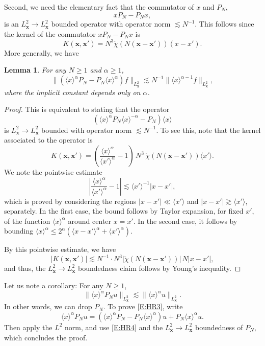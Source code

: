 \documentclass[12pt,letterpaper]{amsart}
\newcommand{\la}{\langle}
\newcommand{\ra}{\rangle}
\newtheorem{lemma}[theorem]{Lemma}
\theoremstyle{remark}
\numberwithin{equation}{section}
\numberwithin{theorem}{section}
\numberwithin{table}{section}
\begin{document}
Second, we need the elementary fact that the commutator of $x$ and $P_N$, 
$$xP_N - P_N x,$$
is an $L_{\mathbf{x}}^2\to L_{\mathbf{x}}^2$ bounded operator with operator norm $\lesssim N^{-1}$.   This follows since the kernel of the commutator $xP_N - P_N x$ is
$$
K(\mathbf{x},\mathbf{x}') = N^3 \check{\chi}(N(\mathbf{x}-\mathbf{x}')) (x-x').
$$
More generally, we have 
\begin{lemma}
For any $N\geq 1$ and $\alpha \geq 1$,
\begin{equation}
\label{E:HR4}
\| (\la x \ra^\alpha P_N - P_N \la x \ra^\alpha) f \|_{L_{\mathbf{x}}^2} \lesssim N^{-1} \|\la x \ra^{\alpha-1} f\|_{L_{\mathbf{x}}^2},
\end{equation}
where the implicit constant depends only on $\alpha$.
\end{lemma}
\begin{proof}
This is equivalent to stating that the operator
$$(\la x\ra^\alpha P_N \la x \ra^{-\alpha} - P_N ) \la x \ra$$ 
is $L_{\mathbf{x}}^2\to L_{\mathbf{x}}^2$ bounded with operator norm $\lesssim N^{-1}$.  To see this, note that the kernel associated to the operator is
$$
K(\mathbf{x},\mathbf{x}')=\left( \frac{\la x\ra^\alpha}{\la x' \ra^\alpha} - 1 \right) \, N^3 \, \check \chi( N(\mathbf{x}-\mathbf{x}')) \la x' \ra.
$$
We note the pointwise estimate
$$
\left| \frac{\la x\ra^\alpha}{\la x' \ra^\alpha} - 1 \right| \lesssim  \la x' \ra^{-1}|x-x'|,
$$
which is proved by considering the regions $|x-x'| \ll \la x' \ra$ and $|x-x'| \gtrsim \la x' \ra$, separately. In the first case, the bound follows by Taylor expansion, for fixed $x'$, of the function $\la x \ra^{\alpha}$ around center $x=x'$.  In the second case, it follows by bounding $\la x \ra^\alpha \leq 2^\alpha(\la x-x' \ra^\alpha + \la x' \ra^\alpha)$.

By this pointwise estimate, we have
$$
|K(\mathbf{x},\mathbf{x}')| \lesssim N^{-1} \cdot N^3 |\check\chi(N(\mathbf{x}-\mathbf{x}'))|\, N|x-x'|,
$$
and thus, the $L_{\mathbf{x}}^2\to L_{\mathbf{x}}^2$ boundedness claim follows by Young's inequality.
\end{proof}

Let us note a corollary:  For any $N \geq 1$,
\begin{equation}
\label{E:HR3}
\| \la x \ra^\alpha P_N u \|_{L_{\mathbf{x}}^2} \lesssim \| \la x \ra^\alpha u \|_{L_{\mathbf{x}}^2}.
\end{equation}
In other words, we can drop $P_N$.  To prove \eqref{E:HR3}, write
$$
\la x \ra^\alpha P_N u = (\la x \ra^\alpha P_N - P_N \la x \ra^\alpha) u + P_N \la x \ra^\alpha u.
$$
Then apply the $L^2$ norm, and use \eqref{E:HR4} and the $L_{\mathbf{x}}^2 \to L_{\mathbf{x}}^2$ boundedness of $P_N$, which concludes the proof.
\end{document}
